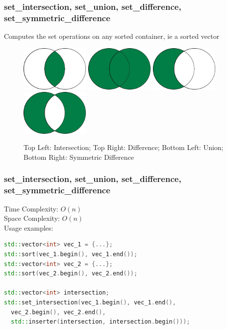 \documentclass{beamer}
\begin{document}
\begin{frame}
  \frametitle{set\_intersection, set\_union, set\_difference, set\_symmetric\_difference}
  Computes the set operations on any sorted container, ie a sorted vector
  \begin{figure}
    \begin{multicols}{2}
      \includegraphics[width=0.3\textwidth]{figures/set_intersection.png}
      \includegraphics[width=0.3\textwidth]{figures/set_union.png}
      \includegraphics[width=0.3\textwidth]{figures/set_difference.png}
      \includegraphics[width=0.3\textwidth]{figures/set_symmetric_difference.png}
    \end{multicols}
    \caption{Top Left: Intersection; Top Right: Difference;
      Bottom Left: Union; Bottom Right: Symmetric Difference}
  \end{figure}
\end{frame}

\begin{frame}[fragile]
  \frametitle{set\_intersection, set\_union, set\_difference, set\_symmetric\_difference}
  Time Complexity: $O(n)$\\
  Space Complexity: $O(n)$\\
  Usage examples:
  \begin{lstlisting}[language=C++]
std::vector<int> vec_1 = {...};
std::sort(vec_1.begin(), vec_1.end());
std::vector<int> vec_2 = {...};
std::sort(vec_2.begin(), vec_2.end());

std::vector<int> intersection;
std::set_intersection(vec_1.begin(), vec_1.end(),
  vec_2.begin(), vec_2.end(),
  std::inserter(intersection, intersection.begin()));
  \end{lstlisting}
\end{frame}
\end{document}
